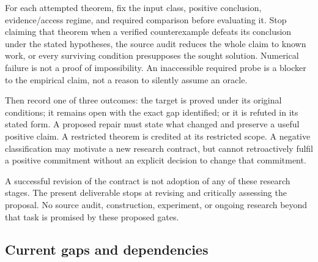 \documentclass[11pt]{article}
\theoremstyle{remark}
\begin{document}
For each attempted theorem, fix the input class, positive conclusion, evidence/access regime, and required comparison before evaluating it. Stop claiming that theorem when a verified counterexample defeats its conclusion under the stated hypotheses, the source audit reduces the whole claim to known work, or every surviving condition presupposes the sought solution. Numerical failure is not a proof of impossibility. An inaccessible required probe is a blocker to the empirical claim, not a reason to silently assume an oracle.

Then record one of three outcomes: the target is proved under its original conditions; it remains open with the exact gap identified; or it is refuted in its stated form. A proposed repair must state what changed and preserve a useful positive claim. A restricted theorem is credited at its restricted scope. A negative classification may motivate a new research contract, but cannot retroactively fulfil a positive commitment without an explicit decision to change that commitment.

A successful revision of the contract is not adoption of any of these research stages. The present deliverable stops at revising and critically assessing the proposal. No source audit, construction, experiment, or ongoing research beyond that task is promised by these proposed gates.

\subsection{Current gaps and dependencies}
\end{document}
